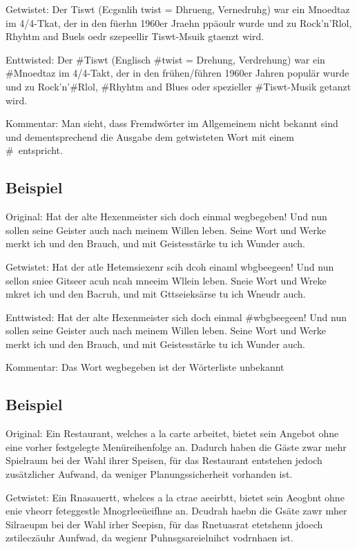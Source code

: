 \documentclass[a4paper,10pt,ngerman]{scrartcl}
\begin{document}
\noindent Getwistet: ﻿Der Tiswt   (Ecgsnlih twist = Dhrueng, Vernedruhg)  war ein Mnoedtaz im 4/4-Tkat,   der in den füerhn 1960er Jraehn ppäoulr   wurde und zu   Rock'n'Rlol, Rhyhtm and Buels oedr szepeellir  Tiswt-Msuik gtaenzt wird.

\noindent Enttwisted: Der \#Tiswt   (Englisch \#twist = Drehung, Verdrehung)  war ein \#Mnoedtaz im 4/4-Takt,   der in den frühen/führen 1960er Jahren populär   wurde und zu   Rock'n'\#Rlol, \#Rhyhtm and Blues oder spezieller  \#Tiswt-Musik getanzt wird.

\noindent Kommentar: Man sieht, dass Fremdwörter im Allgemeinem nicht bekannt sind und dementsprechend die Ausgabe dem getwisteten Wort mit einem \glqq\#\grqq\ entspricht.
\subsection{Beispiel}
\label{hexenmeister}
Original: Hat der alte Hexenmeister sich doch einmal wegbegeben! Und nun sollen seine Geister auch nach meinem Willen leben. Seine Wort und Werke merkt ich und den Brauch, und mit Geistesstärke tu ich Wunder auch.

\noindent Getwistet: Hat der atle Hetemsiexenr scih dcoh einaml wbgbeegeen! Und nun sellon sniee Gitseer acuh ncah mneeim Wllein leben. Sneie Wort und Wreke mkret ich und den Bacruh, und mit Gttseieksärse tu ich Wneudr auch.

\noindent Enttwisted: Hat der alte Hexenmeister sich doch einmal \#wbgbeegeen! Und nun sollen seine Geister auch nach meinem Willen leben. Seine Wort und Werke merkt ich und den Brauch, und mit Geistesstärke tu ich Wunder auch.

\noindent Kommentar: Das Wort wegbegeben ist der Wörterliste unbekannt
\subsection{Beispiel}

\noindent Original: Ein Restaurant, welches a la carte arbeitet, bietet sein Angebot ohne eine vorher festgelegte Menüreihenfolge an. Dadurch haben die Gäste zwar mehr Spielraum bei der Wahl ihrer Speisen, für das Restaurant entstehen jedoch zusätzlicher Aufwand, da weniger Planungssicherheit vorhanden ist.

\noindent Getwistet: Ein Rnasauertt, whelces a la ctrae aeeirbtt, bietet sein Aeogbnt ohne enie vheorr feteggestle Mnogrleeüeifhne an. Dcudrah haebn die Gsäte zawr mher Silraeupm bei der Wahl irher Seepisn, für das Rnetuasrat etetshenn jdoech zstileczäuhr Aunfwad, da wegienr Puhnsgsareielnihct vodrnhaen ist.
\end{document}
